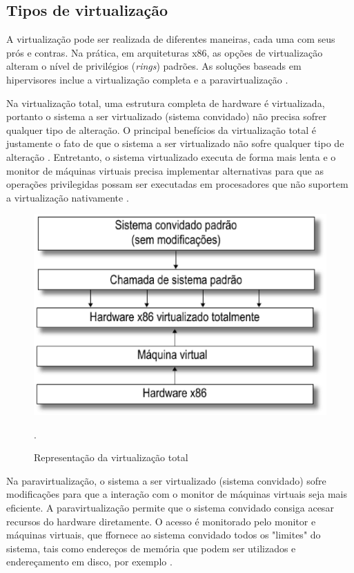 \subsection{Tipos de virtualização}
A virtualização pode ser realizada de diferentes maneiras, cada uma com seus prós e contras. Na prática, em arquiteturas x86, as opções de virtualização alteram o nível de privilégios (\textit{rings}) padrões. As soluções baseads em hipervisores inclue a virtualização completa e a paravirtualização \cite{manoel}.

Na virtualização total, uma estrutura completa de hardware é virtualizada, portanto o sistema a ser virtualizado (sistema convidado) não precisa sofrer qualquer tipo de alteração. O principal benefícios da virtualização total é justamente o fato de que o sistema a ser virtualizado não sofre qualquer tipo de alteração \cite{marcos}. Entretanto, o sistema virtualizado executa de forma mais lenta e o monitor de máquinas virtuais precisa implementar alternativas para que as operações privilegidas possam ser executadas em procesadores que não suportem a virtualização nativamente \cite{marcos}.

\begin{figure}[!htb]
\centering
\includegraphics [keepaspectratio=true,scale=0.30]{figuras/full_virtualization.eps}
\caption{Representação da virtualização total}
\cite{marcos}.
\label{full_virtualization}
\end{figure}

Na paravirtualização, o sistema a ser virtualizado (sistema convidado) sofre modificações para que a interação com o monitor de máquinas virtuais seja mais eficiente. A paravirtualização permite que o sistema convidado consiga acesar recursos do hardware diretamente. O acesso é monitorado pelo monitor e máquinas virtuais, que ffornece ao sistema convidado todos os "limites" do sistema, tais como endereços de memória que podem ser utilizados e endereçamento em disco, por exemplo \cite{marcos}.

